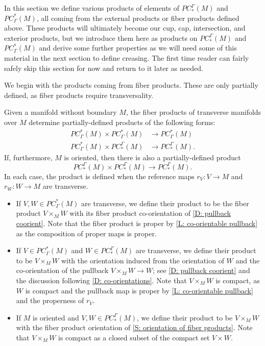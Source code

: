 In this section we define various products of elements of $PC_*^\Gamma(M)$ and $PC^*_\Gamma(M)$, all coming from the external products or fiber products defined above.
These products will ultimately become our cup, cap, intersection, and exterior products, but we introduce them here as products on $PC_*^\Gamma(M)$ and $PC^*_\Gamma(M)$ and derive some further properties as we will need some of this material in the next section to define creasing.
The first time reader can fairly safely skip this section for now and return to it later as needed.

We begin with the products coming from fiber products.
These are only partially defined, as fiber products require transversality.

\begin{definition}\label{D: PC products}
	Given a manifold without boundary $M$, the fiber products of transverse manifolds over $M$ determine partially-defined products of the following forms:
	\begin{align*}
		PC^*_\Gamma(M) \times PC^*_\Gamma(M)& \to PC^*_\Gamma(M)\\
		PC^*_\Gamma(M) \times PC_*^\Gamma(M)& \to PC_*^\Gamma(M).
	\end{align*}
	If, furthermore, $M$ is oriented, then there is also a partially-defined product
	$$PC_*^\Gamma(M) \times PC_*^\Gamma(M) \to PC_*^\Gamma(M).$$
	In each case, the product is defined when the reference maps $r_V \colon V \to M$ and $r_W \colon W \to M$ are transverse.

		\begin{itemize}
			\item If $V,W\in PC^*_\Gamma(M)$ are transverse, we define their product to be the fiber product $V \times_M W$ with its fiber product co-orientation of \cref{D: pullback coorient}. Note that the fiber product is proper by \cref{L: co-orientable pullback} as the composition of proper maps is proper.

			\item If $V \in PC^*_\Gamma(M)$ and $W \in PC_*^\Gamma(M)$ are transverse, we define their product to be $V \times_M W$ with the orientation induced from the orientation of $W$ and the co-orientation of the pullback $V \times_M W \to W$; see \cref{D: pullback coorient} and the discussion following \cref{D: co-orientations}.
			Note that $V \times_M W$ is compact, as $W$ is compact and the pullback map is proper by \cref{L: co-orientable pullback} and the properness of $r_V$.

			\item If $M$ is oriented and $V,W \in PC_*^\Gamma(M)$, we define their product to be $V \times_M W$ with the fiber product orientation of \cref{S: orientation of fiber products}.
			Note that $V \times_M W$ is compact as a closed subset of the compact set $V \times W$.
	\end{itemize}


\end{definition}
